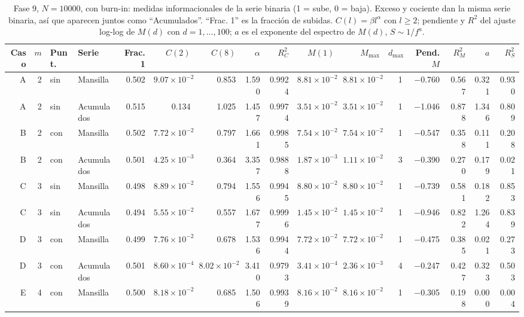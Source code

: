 \documentclass[11pt,letterpaper]{article}
\begin{document}
\begin{table}[H]
\centering
\scriptsize
\setlength{\tabcolsep}{3.5pt}
\caption{Fase 9, $N=10000$, con burn-in: medidas informacionales de la serie binaria (1 = sube, 0 = baja). Exceso y cociente dan la misma serie binaria, así que aparecen juntos como ``Acumulados''. ``Frac. 1'' es la fracción de subidas. $C(l)=\beta l^\alpha$ con $l\ge2$; pendiente y $R^2$ del ajuste log-log de $M(d)$ con $d=1,\dots,100$; $a$ es el exponente del espectro de $M(d)$, $S\sim 1/f^a$.}\label{tab:f9bin}
\begin{adjustbox}{max width=\textwidth}
\begin{tabular}{rrllrrrrrrrrrrrr}
\toprule
Caso & $m$ & Punt. & Serie & Frac. 1 & $C(2)$ & $C(8)$ & $\alpha$ & $R^2_C$ & $M(1)$ & $M_{\max}$ & $d_{\max}$ & Pend. $M$ & $R^2_M$ & $a$ & $R^2_S$ \\
\midrule
A & 2 & sin & Mansilla & 0.502 & $9.07\times10^{-2}$ & 0.853 & 1.590 & 0.9924 & $8.81\times10^{-2}$ & $8.81\times10^{-2}$ & 1 & $-$0.760 & 0.567 & 0.321 & 0.930 \\
A & 2 & sin & Acumulados & 0.515 & 0.134 & 1.025 & 1.457 & 0.9974 & $3.51\times10^{-2}$ & $3.51\times10^{-2}$ & 1 & $-$1.046 & 0.878 & 1.346 & 0.809 \\
B & 2 & con & Mansilla & 0.502 & $7.72\times10^{-2}$ & 0.797 & 1.661 & 0.9985 & $7.54\times10^{-2}$ & $7.54\times10^{-2}$ & 1 & $-$0.547 & 0.358 & 0.111 & 0.208 \\
B & 2 & con & Acumulados & 0.501 & $4.25\times10^{-3}$ & 0.364 & 3.357 & 0.9888 & $1.87\times10^{-3}$ & $1.11\times10^{-2}$ & 3 & $-$0.390 & 0.270 & 0.179 & 0.021 \\
C & 3 & sin & Mansilla & 0.498 & $8.89\times10^{-2}$ & 0.794 & 1.556 & 0.9945 & $8.80\times10^{-2}$ & $8.80\times10^{-2}$ & 1 & $-$0.739 & 0.581 & 0.182 & 0.853 \\
C & 3 & sin & Acumulados & 0.494 & $5.55\times10^{-2}$ & 0.557 & 1.677 & 0.9996 & $1.45\times10^{-2}$ & $1.45\times10^{-2}$ & 1 & $-$0.946 & 0.822 & 1.264 & 0.839 \\
D & 3 & con & Mansilla & 0.499 & $7.76\times10^{-2}$ & 0.678 & 1.536 & 0.9944 & $7.72\times10^{-2}$ & $7.72\times10^{-2}$ & 1 & $-$0.475 & 0.385 & 0.021 & 0.273 \\
D & 3 & con & Acumulados & 0.501 & $8.60\times10^{-4}$ & $8.02\times10^{-2}$ & 3.410 & 0.9793 & $3.41\times10^{-4}$ & $2.36\times10^{-3}$ & 4 & $-$0.247 & 0.427 & 0.323 & 0.503 \\
E & 4 & con & Mansilla & 0.500 & $8.18\times10^{-2}$ & 0.685 & 1.506 & 0.9939 & $8.16\times10^{-2}$ & $8.16\times10^{-2}$ & 1 & $-$0.305 & 0.198 & 0.000 & 0.004 \\

\end{tabular}
\end{adjustbox}
\end{table}
\end{document}

